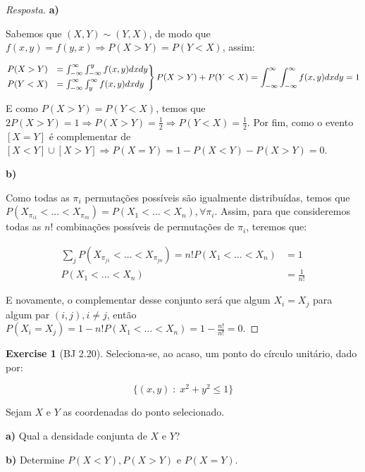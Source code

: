 \documentclass[
]{article}
\theoremstyle{definition}
\theoremstyle{definition}
\theoremstyle{definition}
\newtheorem{exercise}{Exercise}[section]
\theoremstyle{definition}
\theoremstyle{remark}
\begin{document}
\begin{proof}[Resposta]
\textbf{a)}

Sabemos que \((X,Y) \sim (Y,X)\), de modo que \(f(x,y) = f(y,x) \Rightarrow P(X > Y) = P(Y < X)\), assim:

\begin{align*}
\begin{rcases}
P(X > Y) &= \int_{-\infty}^{\infty}\int_{-\infty}^{y}f(x,y)dxdy \\
P(Y < X) &= \int_{-\infty}^{\infty}\int_{y}^{\infty}f(x,y)dxdy
\end{rcases} P(X > Y) + P(Y < X) = \int_{-\infty}^{\infty}\int_{-\infty}^{\infty}f(x,y)dxdy = 1
\end{align*}

E como \(P(X > Y) = P(Y < X)\), temos que \(2P(X > Y) = 1 \Rightarrow P(X > Y) = \frac{1}{2} \Rightarrow P(Y < X) = \frac{1}{2}\). Por fim, como o evento \([X = Y]\) é complementar de \([X<Y] \cup [X>Y] \Rightarrow P(X = Y) = 1 - P(X<Y) - P(X>Y) = 0\).

\textbf{b)}

Como todas as \(\pi_{i}\) permutações possíveis são igualmente distribuídas, temos que \(P(X_{\pi_{i1}} < \ldots < X_{\pi_{in}}) = P(X_{1} < \ldots < X_{n}), \forall \pi_{i}\). Assim, para que consideremos todas as \(n!\) combinações possíveis de permutações de \(\pi_{i}\), teremos que:

\begin{align*}
\sum_{j}P(X_{\pi_{j1}} < \ldots < X_{\pi_{jn}}) = n!P(X_{1} < \ldots < X_{n}) &= 1 \\
P(X_{1} < \ldots < X_{n}) &= \frac{1}{n!}
\end{align*}

E novamente, o complementar desse conjunto será que algum \(X_{i} = X_{j}\) para algum par \((i,j) , i \neq j\), então \(P(X_{i} = X_{j}) = 1 - n!P(X_{1} < \ldots < X_{n}) = 1 - \frac{n!}{n!} = 0\).
\end{proof}

\begin{exercise}[BJ 2.20]
Seleciona-se, ao acaso, um ponto do círculo unitário, dado por:

\begin{equation*}
\{(x,y) \; : \; x^{2} + y^{2} \le 1\}
\end{equation*}

Sejam \(X\) e \(Y\) as coordenadas do ponto selecionado.

\textbf{a)} Qual a densidade conjunta de \(X\) e \(Y\)?

\textbf{b)} Determine \(P(X < Y), P(X > Y)\) e \(P(X = Y)\).
\end{exercise}
\end{document}
